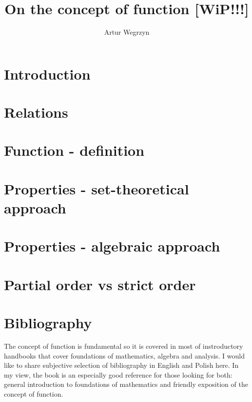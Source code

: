 \documentclass[12pt]{article}
\theoremstyle{plain}
\theoremstyle{definition}
\begin{document}
\title{On the concept of function [WiP!!!]}
\author{Artur Wegrzyn}
\maketitle




\tableofcontents

\section{Introduction}

\section{Relations}

\section{Function - definition}

\section{Properties - set-theoretical approach}

\section{Properties - algebraic approach}

\section{Partial order vs strict order}

\section{Bibliography}
The concept of function is fundamental so it is covered in most of instroductory 
handbooks that cover foundations of mathematics, algebra and analysis. 
I would like to share subjective selection of bibliography in English and Polish here.
In my view, the book \cite{sets_logic_computation} is an especially good reference for 
those looking for both: general introduction to foundations of mathematics and 
friendly exposition of the concept of function.



\end{document}

